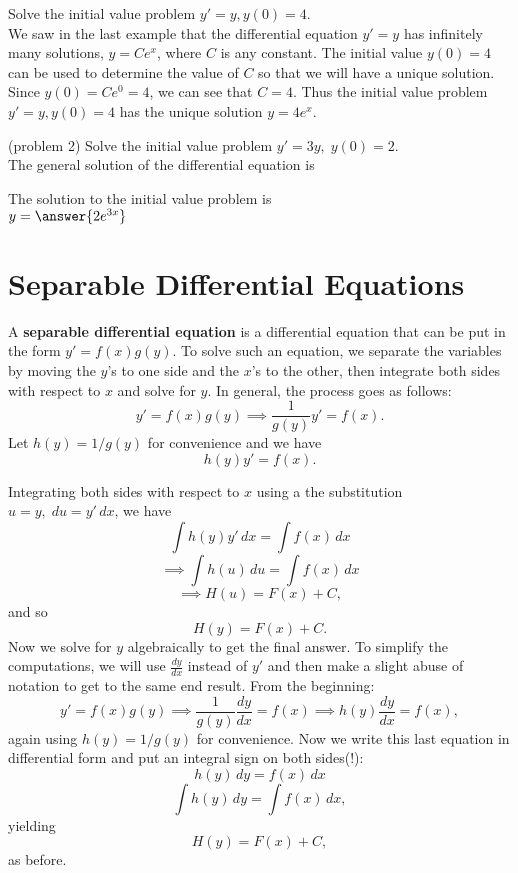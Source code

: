 \documentclass[handout]{ximera}
\begin{document}
\begin{example}[example 2]
Solve the initial value problem $y' = y, y(0) = 4$.\\
We saw in the last example that the differential equation $y' = y$ has infinitely many solutions, $y = Ce^x$, where $C$ is any constant.
The initial value $y(0) = 4$ can be used to determine the value of $C$ so that we will have a unique solution. Since $y(0) = Ce^0 = 4$, we can see that $C = 4$.
Thus the initial value problem $y' = y, y(0) = 4$ has the unique solution $y = 4e^x$.
\end{example}



\begin{problem}(problem 2)
Solve the initial value problem $y' = 3y, \; y(0) = 2$.\\

The general solution of the differential equation is

\begin{multipleChoice}
\end{multipleChoice}

The solution to the initial value problem is\\
$y = \answer{2e^{3x}}$
\end{problem}




\section{Separable Differential Equations}

A \textbf{separable differential equation} is a differential equation that can be put in the form
$y' = f(x)g(y)$. To solve such an equation, we separate the variables by moving the $y$'s to one side and the $x$'s to the other, then integrate both sides with respect to $x$
and solve for $y$. In general, the process goes as follows:
\[
y' = f(x)g(y) \implies \frac{1}{g(y)} y'= f(x) .
\]
Let $h(y) = 1/g(y)$ for convenience and we have
\[
h(y) y'= f(x).
\]

Integrating both sides with respect to $x$ using a the substitution $u = y, \; du = y' \, dx$, we have
\[
\int h(y) y' \, dx = \int f(x) \, dx
\]
\[
\implies \int h(u) \, du = \int f(x) \, dx
\]
\[
\implies H(u) = F(x) + C,
\]
and so
\[
H(y) = F(x) + C.
\]
Now we solve for $y$ algebraically to get the final answer.  To simplify the computations, we will use $\frac{dy}{dx}$ instead of $y'$ and then 
make a slight abuse of notation to get to the same end result. From the beginning:
\[
y' = f(x) g(y) \implies \frac{1}{g(y)} \frac{dy}{dx} = f(x) \implies h(y) \frac{dy}{dx} = f(x),
\]
again using $h(y) = 1/g(y)$ for convenience. Now we write this last equation in differential form and put an integral sign on both sides(!):
\[
h(y)\, dy = f(x) \, dx
\]
\[
\int h(y) \, dy = \int f(x) \, dx,
\]
yielding
\[
H(y) = F(x) + C,
\]
as before.
\end{document}
